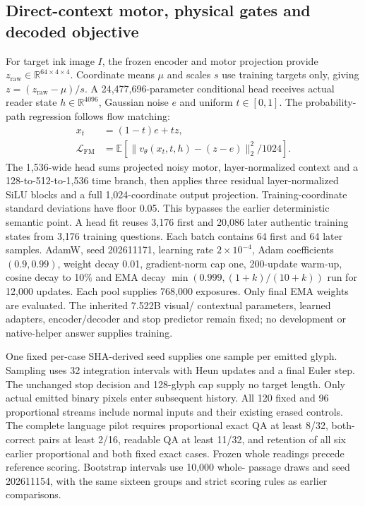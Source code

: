 \subsection*{Direct-context motor, physical gates and decoded objective}
For target ink image $I$, the frozen encoder and motor projection provide
$z_\mathrm{raw}\in\mathbb R^{64\times4\times4}$. Coordinate means $\mu$ and
scales $s$ use training targets only, giving $z=(z_\mathrm{raw}-\mu)/s$.
A 24,477,696-parameter conditional head receives actual reader state
$h\in\mathbb R^{4096}$, Gaussian noise $e$ and uniform $t\in[0,1]$.
The probability-path regression follows flow matching\cite{flowmatching}:
\begin{align}
 x_t&=(1-t)e+tz,\\
 \mathcal L_\mathrm{FM}&=\mathbb E\!\left[
 \|v_\theta(x_t,t,h)-(z-e)\|_2^2/1024\right].
\end{align}
The 1,536-wide head sums projected noisy motor, layer-normalized context
and a 128-to-512-to-1,536 time branch, then applies three residual
layer-normalized SiLU blocks and a full 1,024-coordinate output projection.
Training-coordinate standard deviations have floor 0.05. This bypasses the
earlier deterministic semantic point. A head fit reuses 3,176 first and 20,086 later authentic
training states from 3,176 training questions. Each batch contains 64 first
and 64 later samples. AdamW, seed 202611171, learning rate $2\times10^{-4}$,
Adam coefficients $(0.9,0.99)$, weight decay 0.01, gradient-norm cap one,
200-update warm-up, cosine decay to 10\% and EMA decay
$\min(0.999,(1+k)/(10+k))$ run for 12,000 updates. Each pool supplies 768,000
exposures. Only final EMA weights are evaluated. The inherited 7.522B visual/
contextual parameters, learned adapters, encoder/decoder and stop predictor
remain fixed; no development or native-helper answer supplies training.

One fixed per-case SHA-derived seed supplies one sample per emitted glyph.
Sampling uses 32 integration intervals with Heun updates and a final Euler
step. The unchanged stop decision and 128-glyph cap supply no target length.
Only actual emitted binary pixels enter subsequent history. All 120 fixed
and 96 proportional streams include normal inputs and their existing erased
controls. The complete language pilot requires proportional exact QA at least
8/32, both-correct pairs at least 2/16, readable QA at least 11/32, and retention
of all six earlier proportional and both fixed exact cases. Frozen whole
readings precede reference scoring. Bootstrap intervals use 10,000 whole-
passage draws and seed 202611154, with the same sixteen groups and strict
scoring rules as earlier comparisons.

